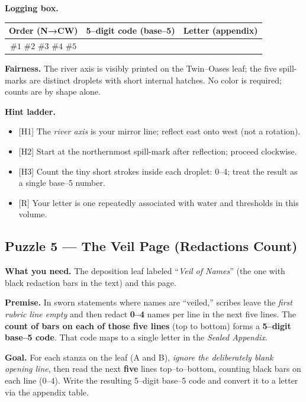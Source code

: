 \documentclass[11pt]{article}
\numberwithin{equation}{section} %
\theoremstyle{plain} %
\theoremstyle{definition} %
\theoremstyle{remark} %
\begin{document}
\medskip
\noindent\textbf{Logging box.}
\begin{center}
\begin{tabular}{c|c|c}
\textbf{Order (N→CW)} & \textbf{5–digit code (base–5)} & \textbf{Letter (appendix)} \\
\hline
\(\#1\) \(\#2\) \(\#3\) \(\#4\) \(\#5\) & \hspace{3.5cm} & \hspace{1.2cm} \\
\end{tabular}
\end{center}

\medskip
\noindent\textbf{Fairness.} The river axis is visibly printed on the Twin–Oases leaf; the five spill-marks are distinct droplets with short internal hatches. No color is required; counts are by shape alone.

\medskip
\noindent\textbf{Hint ladder.}
\begin{itemize}\setlength\itemsep{0.25em}
  \item \textsc{[H1]} The \emph{river axis} is your mirror line; reflect east onto west (not a rotation).
  \item \textsc{[H2]} Start at the northernmost spill-mark after reflection; proceed clockwise.
  \item \textsc{[H3]} Count the tiny short strokes inside each droplet: 0–4; treat the result as a single base–5 number.
  \item \textsc{[R]} Your letter is one repeatedly associated with water and thresholds in this volume.
\end{itemize}

\subsection{Puzzle 5 — The Veil Page (Redactions Count)}
\label{pz:veil-page}

\noindent\textbf{What you need.} The deposition leaf labeled “\textit{Veil of Names}” (the one with black redaction bars in the text) and this page.

\medskip
\noindent\textbf{Premise.} In sworn statements where names are “veiled,” scribes leave the \emph{first rubric line empty} and then redact \textbf{0–4} names per line in the next five lines. The \textbf{count of bars on each of those five lines} (top to bottom) forms a \textbf{5–digit base–5 code}. That code maps to a single letter in the \emph{Sealed Appendix}.

\medskip
\noindent\textbf{Goal.} For each stanza on the leaf (\textsc{A} and \textsc{B}), \emph{ignore the deliberately blank opening line}, then read the next \textbf{five} lines top–to–bottom, counting black bars on each line (0–4). Write the resulting 5–digit base–5 code and convert it to a letter via the appendix table.
\end{document}
